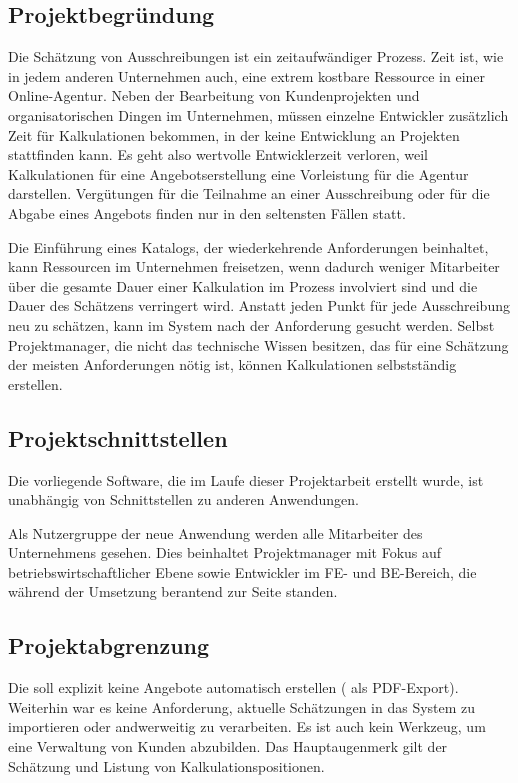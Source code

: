 \subsection{Projektbegründung} 
\label{sec:Projektbegruendung}
Die Schätzung von Ausschreibungen ist ein zeitaufwändiger Prozess. Zeit ist, wie
in jedem anderen Unternehmen auch, eine extrem kostbare Ressource in einer
Online-Agentur. Neben der Bearbeitung von Kundenprojekten und organisatorischen
Dingen im Unternehmen, müssen einzelne Entwickler zusätzlich Zeit für
Kalkulationen bekommen, in der keine Entwicklung an Projekten stattfinden kann.
Es geht also wertvolle Entwicklerzeit verloren, weil Kalkulationen für eine
Angebotserstellung eine Vorleistung für die Agentur darstellen. Vergütungen
für die Teilnahme an einer Ausschreibung oder für die Abgabe eines Angebots
finden nur in den seltensten Fällen statt.

Die Einführung eines Katalogs, der wiederkehrende Anforderungen beinhaltet, kann
Ressourcen im Unternehmen freisetzen, wenn dadurch weniger Mitarbeiter über die
gesamte Dauer einer Kalkulation im Prozess involviert sind und die Dauer des
Schätzens verringert wird. Anstatt jeden Punkt für jede Ausschreibung neu zu
schätzen, kann im System nach der Anforderung gesucht werden. Selbst
Projektmanager, die nicht das technische Wissen besitzen, das für eine Schätzung
der meisten Anforderungen nötig ist, können Kalkulationen selbstständig
erstellen.

\subsection{Projektschnittstellen} 
\label{sec:Projektschnittstellen}
Die vorliegende Software, die im Laufe dieser Projektarbeit erstellt wurde, ist
unabhängig von Schnittstellen zu anderen Anwendungen. 

Als Nutzergruppe der neue Anwendung werden alle Mitarbeiter des Unternehmens
gesehen. Dies beinhaltet Projektmanager mit Fokus auf betriebswirtschaftlicher
Ebene sowie Entwickler im \acs{FE}- und \acs{BE}-Bereich, die während der
Umsetzung berantend zur Seite standen.

\subsection{Projektabgrenzung} 
\label{sec:Projektabgrenzung}
Die {\untertitel} soll explizit keine Angebote automatisch erstellen (\zB
als \acs{PDF}-Export). Weiterhin war es keine Anforderung, aktuelle Schätzungen
in das System zu importieren oder andwerweitig zu verarbeiten. Es ist auch kein
Werkzeug, um eine Verwaltung von Kunden abzubilden. Das Hauptaugenmerk gilt der
Schätzung und Listung von Kalkulationspositionen.
